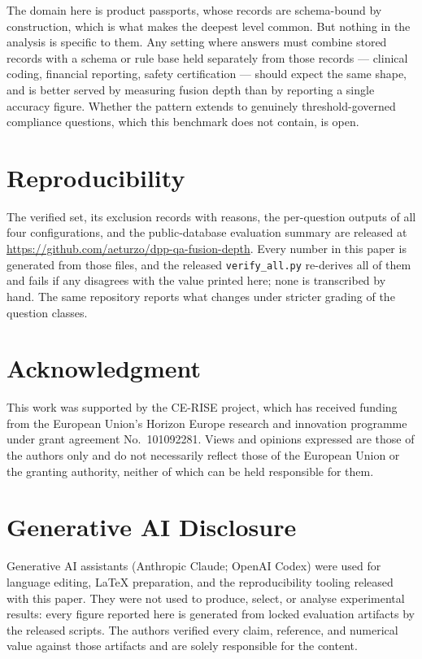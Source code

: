 \documentclass[conference]{IEEEtran}
\begin{document}
The domain here is product passports, whose records are schema-bound by
construction, which is what makes the deepest level common. But nothing in the
analysis is specific to them. Any setting where answers must combine stored
records with a schema or rule base held separately from those records ---
clinical coding, financial reporting, safety certification --- should expect the
same shape, and is better served by measuring fusion depth than by reporting a
single accuracy figure. Whether the pattern extends to genuinely
threshold-governed compliance questions, which this benchmark does not contain,
is open.

\section*{Reproducibility}
The verified set, its exclusion records with reasons, the per-question outputs
of all four configurations, and the public-database evaluation summary are
released at \url{https://github.com/aeturzo/dpp-qa-fusion-depth}. Every number in
this paper is generated from those files, and the released
\texttt{verify\_all.py} re-derives all of them and fails if any disagrees with
the value printed here; none is transcribed by hand. The same repository
reports what changes under stricter grading of the question classes.

\section*{Acknowledgment}
This work was supported by the CE-RISE project, which has received funding from
the European Union's Horizon Europe research and innovation programme under
grant agreement No.\ 101092281. Views and opinions expressed are those of the
authors only and do not necessarily reflect those of the European Union or the
granting authority, neither of which can be held responsible for them.

\section*{Generative AI Disclosure}
Generative AI assistants (Anthropic Claude; OpenAI Codex) were used for language
editing, \LaTeX{} preparation, and the reproducibility tooling released with this
paper. They were not used to produce, select, or analyse experimental results:
every figure reported here is generated from locked evaluation artifacts by the
released scripts. The authors verified every claim, reference, and numerical
value against those artifacts and are solely responsible for the content.



\end{document}
